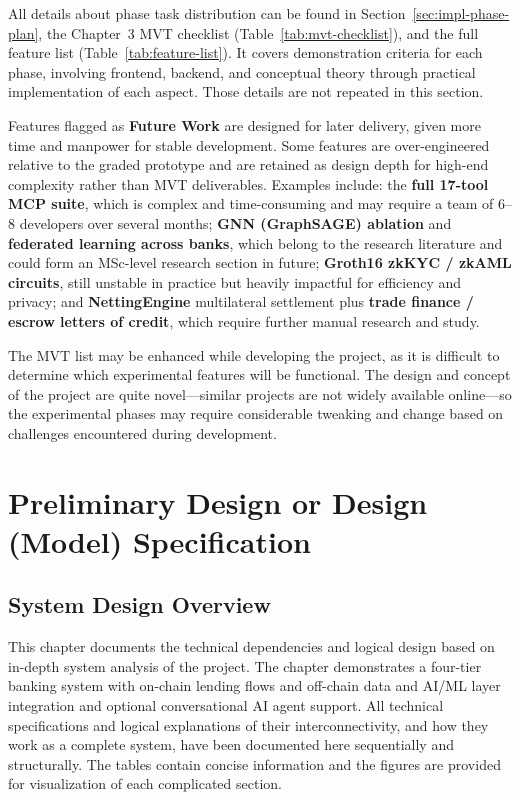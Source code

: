 \documentclass[12pt,a4paper]{report}
\begin{document}
All details about phase task distribution can be found in Section~\ref{sec:impl-phase-plan}, the Chapter~3 MVT checklist (Table~\ref{tab:mvt-checklist}), and the full feature list (Table~\ref{tab:feature-list}). It covers demonstration criteria for each phase, involving frontend, backend, and conceptual theory through practical implementation of each aspect. Those details are not repeated in this section.

Features flagged as \textbf{Future Work} are designed for later delivery, given more time and manpower for stable development. Some features are over-engineered relative to the graded prototype and are retained as design depth for high-end complexity rather than MVT deliverables. Examples include: the \textbf{full 17-tool MCP suite}, which is complex and time-consuming and may require a team of 6--8 developers over several months; \textbf{GNN (GraphSAGE) ablation} and \textbf{federated learning across banks}, which belong to the research literature and could form an MSc-level research section in future; \textbf{Groth16 zkKYC / zkAML circuits}, still unstable in practice but heavily impactful for efficiency and privacy; and \textbf{NettingEngine} multilateral settlement plus \textbf{trade finance / escrow letters of credit}, which require further manual research and study.

The MVT list may be enhanced while developing the project, as it is difficult to determine which experimental features will be functional. The design and concept of the project are quite novel---similar projects are not widely available online---so the experimental phases may require considerable tweaking and change based on challenges encountered during development.

\section{Preliminary Design or Design (Model) Specification}
\label{sec:preliminary-design-specification}

\subsection{System Design Overview}
\label{sec:prototype-scope}
This chapter documents the technical dependencies and logical design based on in-depth system analysis of the project. The chapter demonstrates a four-tier banking system with on-chain lending flows and off-chain data and AI/ML layer integration and optional conversational AI agent support. All technical specifications and logical explanations of their interconnectivity, and how they work as a complete system, have been documented here sequentially and structurally. The tables contain concise information and the figures are provided for visualization of each complicated section.
\end{document}
